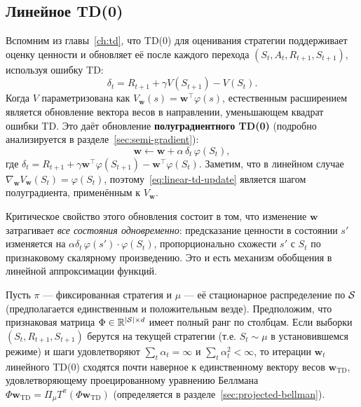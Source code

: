 \subsection{Линейное TD(0)}
\label{subsec:linear-td}

Вспомним из главы~\ref{ch:td}, что TD(0) для оценивания стратегии поддерживает оценку ценности и обновляет её после каждого перехода $(S_t, A_t, R_{t+1}, S_{t+1})$, используя ошибку TD:
\[
\delta_t = R_{t+1} + \gamma V(S_{t+1}) - V(S_t).
\]
Когда $V$ параметризована как $V_\mathbf{w}(s) = \mathbf{w}^\top \varphi(s)$, естественным расширением является обновление вектора весов в направлении, уменьшающем квадрат ошибки TD.  Это даёт обновление \textbf{полуградиентного TD(0)} (подробно анализируется в разделе~\ref{sec:semi-gradient}):
\begin{equation}
\label{eq:linear-td-update}
\mathbf{w} \leftarrow \mathbf{w} + \alpha\, \delta_t\, \varphi(S_t),
\end{equation}
где $\delta_t = R_{t+1} + \gamma \mathbf{w}^\top \varphi(S_{t+1}) - \mathbf{w}^\top \varphi(S_t)$.
Заметим, что в линейном случае $\nabla_\mathbf{w} V_\mathbf{w}(S_t) = \varphi(S_t)$, поэтому~\eqref{eq:linear-td-update} является шагом полуградиента, применённым к $V_\mathbf{w}$.

Критическое свойство этого обновления состоит в том, что изменение $\mathbf{w}$ затрагивает \emph{все состояния одновременно}: предсказание ценности в состоянии $s'$ изменяется на $\alpha \delta_t \, \varphi(s') \cdot \varphi(S_t)$, пропорционально схожести $s'$ с $S_t$ по признаковому скалярному произведению.  Это и есть механизм обобщения в линейной аппроксимации функций.

\begin{theorem}
\label{thm:linear-td-convergence}
Пусть $\pi$ --- фиксированная стратегия и $\mu$ --- её стационарное распределение по $\mathcal{S}$ (предполагается единственным и положительным везде).  Предположим, что признаковая матрица $\Phi \in \mathbb{R}^{|\mathcal{S}| \times d}$ имеет полный ранг по столбцам.  Если выборки $(S_t, R_{t+1}, S_{t+1})$ берутся на текущей стратегии (т.е. $S_t \sim \mu$ в установившемся режиме) и шаги удовлетворяют $\sum_t \alpha_t = \infty$ и $\sum_t \alpha_t^2 < \infty$, то итерации $\mathbf{w}_t$ линейного TD(0) сходятся почти наверное к единственному вектору весов $\mathbf{w}_{\mathrm{TD}}$, удовлетворяющему проецированному уравнению Беллмана $\Phi \mathbf{w}_{\mathrm{TD}} = \Pi_\mu T^\pi (\Phi \mathbf{w}_{\mathrm{TD}})$ (определяется в разделе~\ref{sec:projected-bellman}).
\end{theorem}

